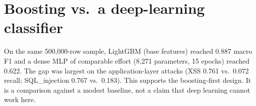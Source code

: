 \section{Boosting vs.\ a deep-learning classifier}
On the same 500{,}000-row sample, LightGBM (base features) reached 0.887 macro F1 and a dense MLP of comparable effort (8{,}271 parameters, 15 epochs) reached 0.622. The gap was largest on the application-layer attacks (XSS 0.761 vs.\ 0.072 recall; SQL\_injection 0.767 vs.\ 0.183). This supports the boosting-first design. It is a comparison against a modest baseline, not a claim that deep learning cannot work here.
